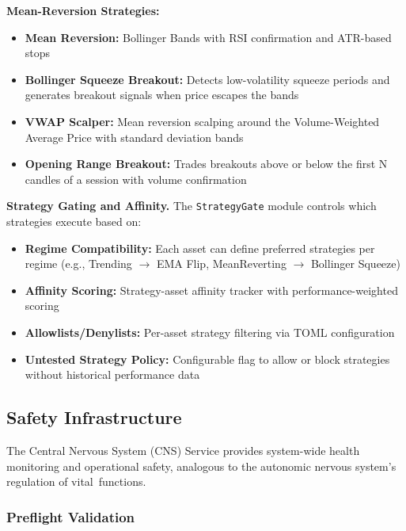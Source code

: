 \documentclass[12pt, a4paper]{article}
\begin{document}
\textbf{Mean-Reversion Strategies:}
\begin{itemize}
	\item \textbf{Mean Reversion:} Bollinger Bands with RSI confirmation and ATR-based stops
	\item \textbf{Bollinger Squeeze Breakout:} Detects low-volatility squeeze periods and generates breakout signals when price escapes the bands
	\item \textbf{VWAP Scalper:} Mean reversion scalping around the Volume-Weighted Average Price with standard deviation bands
	\item \textbf{Opening Range Breakout:} Trades breakouts above or below the first N candles of a session with volume confirmation
\end{itemize}

\textbf{Strategy Gating and Affinity.}
The \texttt{StrategyGate} module controls which strategies execute based on:

\begin{itemize}
	\item \textbf{Regime Compatibility:} Each asset can define preferred strategies per regime (e.g., Trending $\to$ EMA Flip, MeanReverting $\to$ Bollinger Squeeze)
	\item \textbf{Affinity Scoring:} Strategy-asset affinity tracker with performance-weighted scoring
	\item \textbf{Allowlists/Denylists:} Per-asset strategy filtering via TOML configuration
	\item \textbf{Untested Strategy Policy:} Configurable flag to allow or block strategies without historical performance data
\end{itemize}

\subsection{Safety Infrastructure}
\label{sec:safety}

The Central Nervous System (CNS) Service provides system-wide health monitoring and operational safety, analogous to the autonomic nervous system's regulation of vital~functions.

\subsubsection{Preflight Validation}
\end{document}
